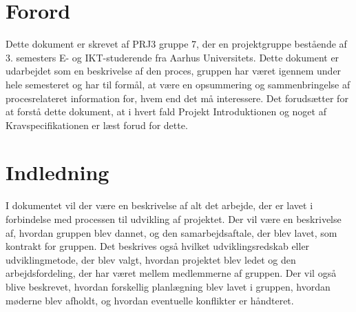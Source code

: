 \documentclass[a4paper,12pt,fleqn,oneside]{article}
\begin{document}

\tableofcontents
\newpage
\begin{table}[H]
\centering
{}
\caption{Versions Historik}
\label{process_version}
\end{table}

\section{Forord}
Dette dokument er skrevet af PRJ3 gruppe 7, der en projektgruppe bestående af 3. semesters E- og IKT-studerende fra Aarhus Universitets. Dette dokument er udarbejdet som en beskrivelse af den proces, gruppen har været igennem under hele semesteret og har til formål, at være en opsummering og sammenbringelse af procesrelateret information for, hvem end det må interessere. Det forudsætter for at forstå dette dokument, at i hvert fald Projekt Introduktionen og noget af Kravspecifikationen er læst forud for dette. 

\section{Indledning}
I dokumentet vil der være en beskrivelse af alt det arbejde, der er lavet i forbindelse med processen til udvikling af projektet. Der vil være en beskrivelse af, hvordan gruppen blev dannet, og den samarbejdsaftale, der blev lavet, som kontrakt for gruppen. Det beskrives også hvilket udviklingsredskab eller udviklingmetode, der blev valgt, hvordan projektet blev ledet og den arbejdsfordeling, der har været mellem medlemmerne af gruppen. Der vil også blive beskrevet, hvordan forskellig planlægning blev lavet i gruppen, hvordan møderne blev afholdt, og hvordan eventuelle konflikter er håndteret.
\end{document}
